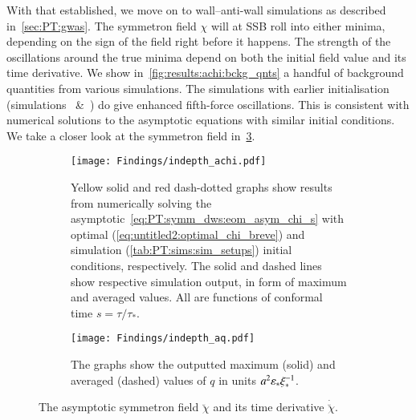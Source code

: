 With that established, we move on to wall--anti-wall simulations as described in~\cref{sec:PT:gwas}. %
The symmetron field $\chi$ will at SSB roll into either minima, depending on the sign of the field right before it happens. The strength of the oscillations around the true minima depend on both the initial field value and its time derivative. %
We show in~\cref{fig:results:achi:bckg_qnts} a handful of background quantities from various simulations. %
The simulations with earlier initialisation (simulations~ \&~) do give enhanced fifth-force oscillations. This is consistent with numerical solutions to the asymptotic equations with similar initial conditions. We take a closer look at the symmetron field in~\cref{fig:results:achi:indepth_achi_aq}. %


\begin{figure}[ht]
    \centering
    \begin{subfigure}[b]{\linewidth}
        \centering
        \texttt{[image: Findings/indepth\_achi.pdf]}
        \caption{Yellow solid and red dash-dotted graphs show results from numerically solving the asymptotic~\cref{eq:PT:symm_dws:eom_asym_chi_s} with optimal (\cref{eq:untitled2:optimal_chi_breve}) and simulation (\cref{tab:PT:sims:sim_setups}) initial conditions, respectively. The solid and dashed lines show respective simulation output, in form of maximum and averaged values. All are functions of conformal time $s=\tau/\tau_\ast$.}
        \label{fig:results:achi:indepth_achi}
    \end{subfigure}
    \hfill
    \begin{subfigure}[b]{\linewidth}
        \centering
        \texttt{[image: Findings/indepth\_aq.pdf]}
        \caption{The graphs show the outputted maximum (solid) and averaged (dashed) values of $q$ in units $a^2 \varepsilon_\ast \xi_\ast^{-1}$.}
        \label{fig:results:achi:indepth_aq}
    \end{subfigure}
    \caption{The asymptotic symmetron field $\breve{\chi}$ and its time derivative $\dot{\breve{\chi}}$.}
    \label{fig:results:achi:indepth_achi_aq}
\end{figure}

